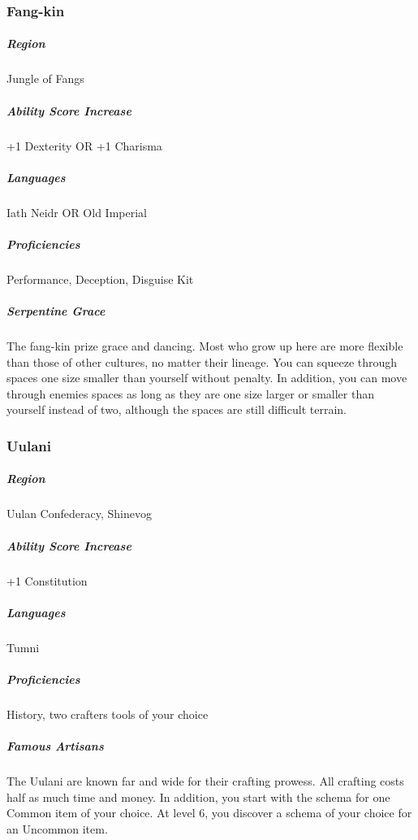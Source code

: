 \subsubsection{Fang-kin}
\subparagraph*{Region} Jungle of Fangs

\subparagraph*{Ability Score Increase} +1 Dexterity OR +1 Charisma

\subparagraph*{Languages} Iath Neidr OR Old Imperial

\subparagraph*{Proficiencies} Performance, Deception, Disguise Kit

\subparagraph*{Serpentine Grace} The fang-kin prize grace and dancing. Most who grow up here are more flexible than those of other cultures, no matter their lineage. You can squeeze through spaces one size smaller than yourself without penalty. In addition, you can move through enemies spaces as long as they are one size larger or smaller than yourself instead of two, although the spaces are still difficult terrain. 

\subsubsection{Uulani}
\subparagraph*{Region} Uulan Confederacy, Shinevog

\subparagraph*{Ability Score Increase} +1 Constitution

\subparagraph*{Languages} Tumni

\subparagraph*{Proficiencies} History, two crafters tools of your choice

\subparagraph*{Famous Artisans} The Uulani are known far and wide for their crafting prowess. All crafting costs half as much time and money. In addition, you start with the schema for one Common item of your choice. At level 6, you discover a schema of your choice for an Uncommon item.
